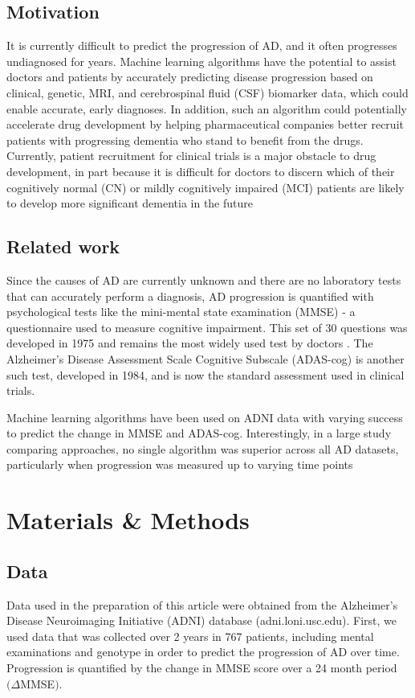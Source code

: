 \documentclass{article}
\begin{document}
\subsection{Motivation}
It is currently difficult to predict the progression of AD, and it often progresses undiagnosed for years. Machine learning algorithms have the potential to assist doctors and patients by accurately predicting disease progression based on clinical,  genetic, MRI, and cerebrospinal fluid (CSF) biomarker data, which could enable accurate, early diagnoses. In addition, such an algorithm could potentially accelerate drug development by helping pharmaceutical companies better recruit patients with progressing dementia who stand to benefit from the drugs. Currently, patient recruitment for clinical trials is a major obstacle to drug development, in part because it is difficult for doctors to discern which of their cognitively normal (CN) or mildly cognitively impaired (MCI) patients are likely to develop more significant dementia in the future %

\subsection{Related work} Since the causes of AD are currently unknown and there are no laboratory tests that can accurately perform a diagnosis, AD progression is quantified with psychological tests like the mini-mental state examination (MMSE) - a questionnaire used to measure cognitive impairment. This set of 30 questions was developed in 1975 and remains the most widely used test by doctors \cite{carolan07}. The Alzheimer's Disease Assessment Scale Cognitive Subscale (ADAS-cog) is another such test, developed in 1984, and is now the standard assessment used in clinical trials. %

Machine learning algorithms have been used on ADNI data with varying success to predict the change in MMSE and ADAS-cog. %
Interestingly, in a large study comparing approaches, no single algorithm was superior across all AD datasets, particularly when progression was measured up to varying time points \cite{umer11}


\section{Materials \& Methods}
\subsection{Data} Data used in the preparation of this article were obtained from the Alzheimer's Disease Neuroimaging Initiative (ADNI) database (adni.loni.usc.edu). First, we used data that was collected over 2 years in 767 patients, including mental examinations and genotype in order to predict the progression of AD over time. Progression is quantified by the change in MMSE score over a 24 month period $(\Delta$MMSE$)$.\\
\end{document}
